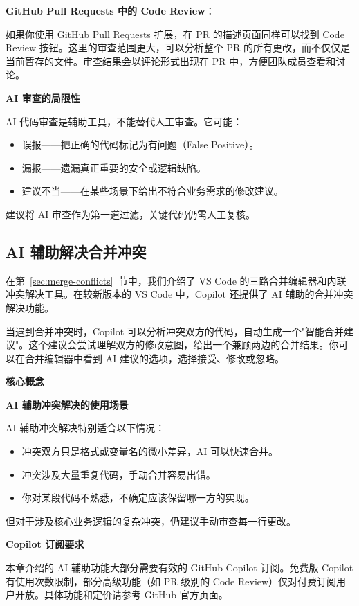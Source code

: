\documentclass[12pt,a4paper,openany]{ctexbook}
\newenvironment{keybox}{%
  \medskip
  \noindent\textbf{\faKey\; 核心概念}
  \smallskip
}{%
  \medskip
}
\begin{document}
\textbf{GitHub Pull Requests 中的 Code Review}：

如果你使用 GitHub Pull Requests 扩展，在 PR 的描述页面同样可以找到 Code Review 按钮。这里的审查范围更大，可以分析整个 PR 的所有更改，而不仅仅是当前暂存的文件。审查结果会以评论形式出现在 PR 中，方便团队成员查看和讨论。

\begin{warnbox}
\textbf{AI 审查的局限性}

AI 代码审查是辅助工具，不能替代人工审查。它可能：
\begin{itemize}[leftmargin=2em]
  \item 误报——把正确的代码标记为有问题（False Positive）。
  \item 漏报——遗漏真正重要的安全或逻辑缺陷。
  \item 建议不当——在某些场景下给出不符合业务需求的修改建议。
\end{itemize}
建议将 AI 审查作为第一道过滤，关键代码仍需人工复核。
\end{warnbox}

\subsection{AI 辅助解决合并冲突}

在第~\ref{sec:merge-conflicts}~节中，我们介绍了 VS Code 的三路合并编辑器和内联冲突解决工具。在较新版本的 VS Code 中，Copilot 还提供了 AI 辅助的合并冲突解决功能。

当遇到合并冲突时，Copilot 可以分析冲突双方的代码，自动生成一个"智能合并建议"。这个建议会尝试理解双方的修改意图，给出一个兼顾两边的合并结果。你可以在合并编辑器中看到 AI 建议的选项，选择接受、修改或忽略。

\begin{keybox}
\textbf{AI 辅助冲突解决的使用场景}

AI 辅助冲突解决特别适合以下情况：
\begin{itemize}[leftmargin=2em]
  \item 冲突双方只是格式或变量名的微小差异，AI 可以快速合并。
  \item 冲突涉及大量重复代码，手动合并容易出错。
  \item 你对某段代码不熟悉，不确定应该保留哪一方的实现。
\end{itemize}
但对于涉及核心业务逻辑的复杂冲突，仍建议手动审查每一行更改。
\end{keybox}

\begin{warnbox}
\textbf{Copilot 订阅要求}

本章介绍的 AI 辅助功能大部分需要有效的 GitHub Copilot 订阅。免费版 Copilot 有使用次数限制，部分高级功能（如 PR 级别的 Code Review）仅对付费订阅用户开放。具体功能和定价请参考 GitHub 官方页面。
\end{warnbox}
\end{document}

